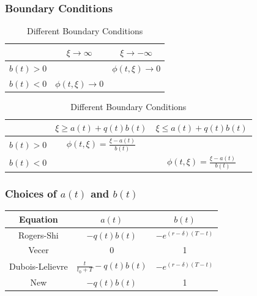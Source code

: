 \documentclass{beamer}
\begin{document}
  \begin{frame}
    \frametitle{Boundary Conditions}
    \begin{table}[h]
      \begin{tabular}{|c|c|c|}
        \hline
        & \(\xi \rightarrow \infty\) & \(\xi \rightarrow -\infty\) \\
        \hline
        \(b(t) > 0\) &  & \(\phi(t, \xi) \rightarrow 0\) \\
        \(b(t) < 0\) & \(\phi(t, \xi) \rightarrow 0\) & \\
        \hline
      \end{tabular}
      \begin{tabular}{|c|c|c|}
        \hline
        & \(\xi \ge a(t) + q(t)b(t)\) & \(\xi \le a(t) + q(t)b(t)\) \\
        \hline
        \(b(t) > 0\) & \(\phi(t, \xi) = \frac{\xi-a(t)}{b(t)} \) & \\
        \(b(t) < 0\) &  & \( \phi(t, \xi) = \frac{\xi-a(t)}{b(t)} \) \\
        \hline
      \end{tabular}
      \caption{Different Boundary Conditions}
    \end{table}
  \end{frame}

  \begin{frame}
    \frametitle{Choices of \(a(t)\) and \(b(t)\)}
    \begin{table}[h]
      \begin{tabular}{|c|c|c|}
      \hline
      Equation & \(a(t)\) & \(b(t)\) \\
      \hline
      Rogers-Shi & \(-q(t)b(t)\) & \(-e^{(r-\delta)(T-t)}\) \\
      Vecer & 0 & 1 \\
      Dubois-Lelievre & \(\frac{t}{t_0 + T} - q(t)b(t) \) & \(-e^{(r-\delta)(T-t)}\) \\
      New & \(-q(t)b(t)\) & 1 \\
      \hline
      \end{tabular}
    \end{table}
  \end{frame}
\end{document}
